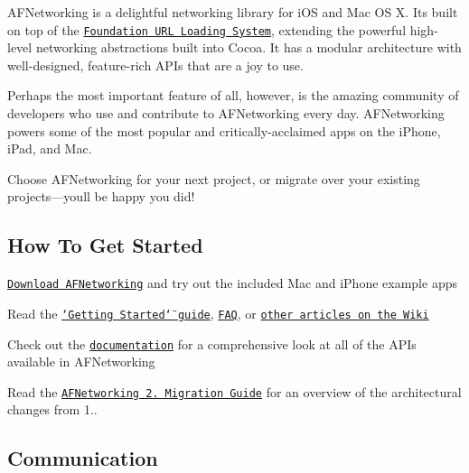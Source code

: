  

\href{https://travis-ci.org/AFNetworking/AFNetworking}{\tt }

A\+F\+Networking is a delightful networking library for i\+OS and Mac OS X. It\textquotesingle{}s built on top of the \href{http://developer.apple.com/library/mac/#documentation/Cocoa/Conceptual/URLLoadingSystem/URLLoadingSystem.html}{\tt Foundation U\+RL Loading System}, extending the powerful high-\/level networking abstractions built into Cocoa. It has a modular architecture with well-\/designed, feature-\/rich A\+P\+Is that are a joy to use.

Perhaps the most important feature of all, however, is the amazing community of developers who use and contribute to A\+F\+Networking every day. A\+F\+Networking powers some of the most popular and critically-\/acclaimed apps on the i\+Phone, i\+Pad, and Mac.

Choose A\+F\+Networking for your next project, or migrate over your existing projects—you\textquotesingle{}ll be happy you did!

\subsection*{How To Get Started}


\begin{DoxyItemize}
\item \href{https://github.com/AFNetworking/AFNetworking/archive/master.zip}{\tt Download A\+F\+Networking} and try out the included Mac and i\+Phone example apps
\item Read the \href{https://github.com/AFNetworking/AFNetworking/wiki/Getting-Started-with-AFNetworking}{\tt \char`\"{}\+Getting Started\char`\"{} guide}, \href{https://github.com/AFNetworking/AFNetworking/wiki/AFNetworking-FAQ}{\tt F\+AQ}, or \href{https://github.com/AFNetworking/AFNetworking/wiki}{\tt other articles on the Wiki}
\item Check out the \href{http://cocoadocs.org/docsets/AFNetworking/}{\tt documentation} for a comprehensive look at all of the A\+P\+Is available in A\+F\+Networking
\item Read the \href{https://github.com/AFNetworking/AFNetworking/wiki/AFNetworking-2.0-Migration-Guide}{\tt A\+F\+Networking 2. Migration Guide} for an overview of the architectural changes from 1..
\end{DoxyItemize}

\subsection*{Communication}


